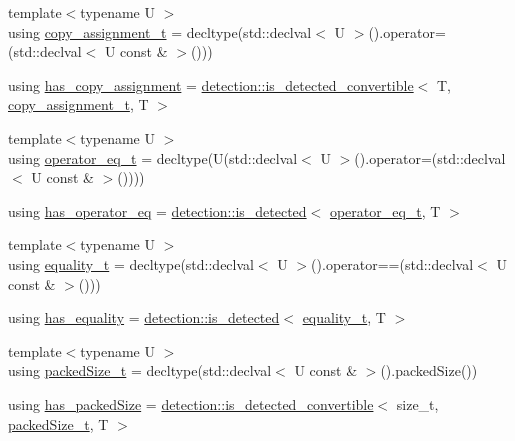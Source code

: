 \begin{DoxyCompactItemize}
\item 
{\footnotesize template$<$typename U $>$ }\\using \hyperlink{structvt_1_1index_1_1_index_traits_ad8fed19c85f6bf6fb280a492c4bf04c5}{copy\+\_\+assignment\+\_\+t} = decltype(std\+::declval$<$ U $>$().operator=(std\+::declval$<$ U const  \& $>$()))
\item 
using \hyperlink{structvt_1_1index_1_1_index_traits_a2ff2ef964f69ad35d99697ad657da0c3}{has\+\_\+copy\+\_\+assignment} = \hyperlink{namespacedetection_afb970b23e39cfecb33449d40242c49ff}{detection\+::is\+\_\+detected\+\_\+convertible}$<$ T, \hyperlink{structvt_1_1index_1_1_index_traits_ad8fed19c85f6bf6fb280a492c4bf04c5}{copy\+\_\+assignment\+\_\+t}, T $>$
\item 
{\footnotesize template$<$typename U $>$ }\\using \hyperlink{structvt_1_1index_1_1_index_traits_a23832f22385d2d20bb1fc9885aef6146}{operator\+\_\+eq\+\_\+t} = decltype(U(std\+::declval$<$ U $>$().operator=(std\+::declval$<$ U const  \& $>$())))
\item 
using \hyperlink{structvt_1_1index_1_1_index_traits_a93695cc99aee3cbdc63a3e2ab9b3f6be}{has\+\_\+operator\+\_\+eq} = \hyperlink{namespacedetection_a30893549a3de1e9603d78dad6d5dce92}{detection\+::is\+\_\+detected}$<$ \hyperlink{structvt_1_1index_1_1_index_traits_a23832f22385d2d20bb1fc9885aef6146}{operator\+\_\+eq\+\_\+t}, T $>$
\item 
{\footnotesize template$<$typename U $>$ }\\using \hyperlink{structvt_1_1index_1_1_index_traits_a87c63bbffab452de516eb2dbc93c07e3}{equality\+\_\+t} = decltype(std\+::declval$<$ U $>$().operator==(std\+::declval$<$ U const  \& $>$()))
\item 
using \hyperlink{structvt_1_1index_1_1_index_traits_abd8f9e796291242c027dd33d9a21acab}{has\+\_\+equality} = \hyperlink{namespacedetection_a30893549a3de1e9603d78dad6d5dce92}{detection\+::is\+\_\+detected}$<$ \hyperlink{structvt_1_1index_1_1_index_traits_a87c63bbffab452de516eb2dbc93c07e3}{equality\+\_\+t}, T $>$
\item 
{\footnotesize template$<$typename U $>$ }\\using \hyperlink{structvt_1_1index_1_1_index_traits_a6d511f10a88cd9fb5b4d832127ce5044}{packed\+Size\+\_\+t} = decltype(std\+::declval$<$ U const  \& $>$().packed\+Size())
\item 
using \hyperlink{structvt_1_1index_1_1_index_traits_a257797ee702aa2108e9950f9aba373a4}{has\+\_\+packed\+Size} = \hyperlink{namespacedetection_afb970b23e39cfecb33449d40242c49ff}{detection\+::is\+\_\+detected\+\_\+convertible}$<$ size\+\_\+t, \hyperlink{structvt_1_1index_1_1_index_traits_a6d511f10a88cd9fb5b4d832127ce5044}{packed\+Size\+\_\+t}, T $>$

\end{DoxyCompactItemize}
